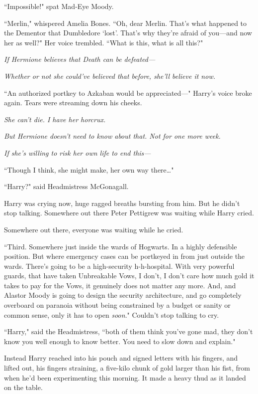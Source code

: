 ``Impossible!" spat Mad-Eye Moody.

``Merlin," whispered Amelia Bones. ``Oh, dear Merlin. That's what happened to the Dementor that Dumbledore `lost'. That's why they're afraid of you—and now her as well?" Her voice trembled. ``What is this, what is all this?"

\emph{If Hermione believes that Death can be defeated—}

\emph{Whether or not she could've believed that before, she'll believe it now.}

``An authorized portkey to Azkaban would be appreciated—" Harry's voice broke again. Tears were streaming down his cheeks.

\emph{She can't die. I have her horcrux.}

\emph{But Hermione doesn't need to know about that. Not for one more week.}

\emph{If she's willing to risk her own life to end this—}

``Though I think, she might make, her own way there{\ldots}"

``Harry?" said Headmistress McGonagall.

Harry was crying now, huge ragged breaths bursting from him. But he didn't stop talking. Somewhere out there Peter Pettigrew was waiting while Harry cried.

Somewhere out there, everyone was waiting while he cried.

``Third. Somewhere just inside the wards of Hogwarts. In a highly defensible position. But where emergency cases can be portkeyed in from just outside the wards. There's going to be a high-security h-h-hospital. With very powerful guards, that have taken Unbreakable Vows, I don't, I don't care how much gold it takes to pay for the Vows, it genuinely does not matter any more. And, and Alastor Moody is going to design the security architecture, and go completely overboard on paranoia without being constrained by a budget or sanity or common sense, only it has to open \emph{soon}." Couldn't stop talking to cry.

``Harry," said the Headmistress, ``both of them think you've gone mad, they don't know you well enough to know better. You need to slow down and explain."

Instead Harry reached into his pouch and signed letters with his fingers, and lifted out, his fingers straining, a five-kilo chunk of gold larger than his fist, from when he'd been experimenting this morning. It made a heavy thud as it landed on the table.

